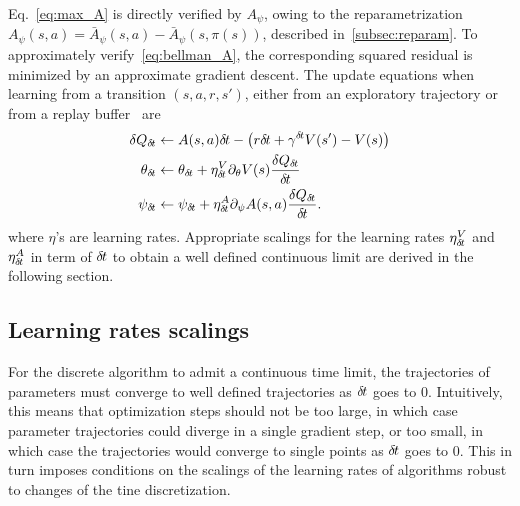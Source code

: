 Eq.~\eqref{eq:max_A}
is directly verified by $A_{\psi}$, owing to the reparametrization
$A_\psi(s, a) = \bar{A}_\psi(s, a) - \bar{A}_\psi(s, \pi(s))$, described
in~\ref{subsec:reparam}.  To approximately verify~\eqref{eq:bellman_A}, the
corresponding squared residual is minimized by an approximate gradient descent.
The update equations when learning from a transition $(s, a, r, s')$, either from
an exploratory trajectory or from a replay buffer~\cite{dqn} are
\begin{align}
	\delta Q_{\delta\hspace{-.1em}t} &\leftarrow A(s, a) {\delta\hspace{-.1em}t} - \left(r {\delta\hspace{-.1em}t} + \gamma^{{\delta\hspace{-.1em}t}} V(s') - V(s)\right)\\
	\theta_{\delta\hspace{-.1em}t} &\leftarrow \theta_{\delta\hspace{-.1em}t} + \eta^V_{\delta\hspace{-.1em}t} \partial_{\theta} V(s) \frac{\delta Q_{\delta\hspace{-.1em}t}}{{\delta\hspace{-.1em}t}}\\
	\psi_{\delta\hspace{-.1em}t} &\leftarrow \psi_{\delta\hspace{-.1em}t} + \eta^A_{\delta\hspace{-.1em}t} \partial_{\psi} A(s, a) \frac{\delta Q_{\delta\hspace{-.1em}t}}{{\delta\hspace{-.1em}t}}.
	\label{eq:approx_bellman_A}
\end{align} 
where $\eta$'s are learning rates.
Appropriate scalings for the learning rates $\eta^V_{\delta\hspace{-.1em}t}$ and $\eta^A_{\delta\hspace{-.1em}t}$ in term of ${\delta\hspace{-.1em}t}$ to obtain a well defined continuous limit are derived in the following section.
\subsection{Learning rates scalings}
\label{subsec:lr}

For the discrete algorithm to admit a continuous time limit, the trajectories
of parameters must converge to well defined trajectories as ${\delta\hspace{-.1em}t}$ goes to
$0$.  Intuitively, this means that optimization steps should not be too large,
in which case parameter trajectories could diverge in a single gradient step,
or too small, in which case the trajectories would converge to single points as
${\delta\hspace{-.1em}t}$ goes to $0$.  This in turn imposes conditions on the scalings of the
learning rates of algorithms robust to changes of the tine discretization.

